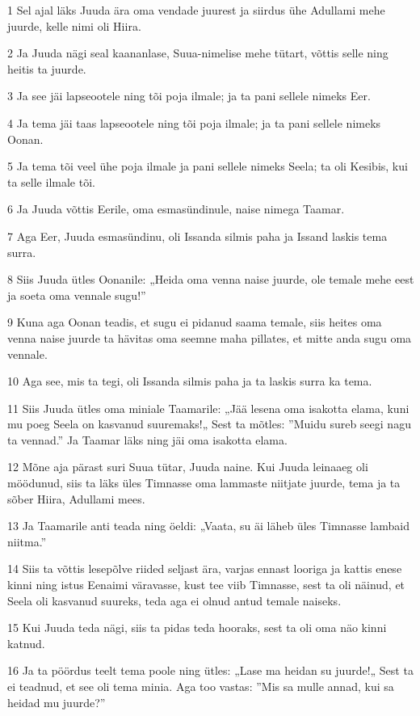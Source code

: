\par 1 Sel ajal läks Juuda ära oma vendade juurest ja siirdus ühe Adullami mehe juurde, kelle nimi oli Hiira.
\par 2 Ja Juuda nägi seal kaananlase, Suua-nimelise mehe tütart, võttis selle ning heitis ta juurde.
\par 3 Ja see jäi lapseootele ning tõi poja ilmale; ja ta pani sellele nimeks Eer.
\par 4 Ja tema jäi taas lapseootele ning tõi poja ilmale; ja ta pani sellele nimeks Oonan.
\par 5 Ja tema tõi veel ühe poja ilmale ja pani sellele nimeks Seela; ta oli Kesibis, kui ta selle ilmale tõi.
\par 6 Ja Juuda võttis Eerile, oma esmasündinule, naise nimega Taamar.
\par 7 Aga Eer, Juuda esmasündinu, oli Issanda silmis paha ja Issand laskis tema surra.
\par 8 Siis Juuda ütles Oonanile: „Heida oma venna naise juurde, ole temale mehe eest ja soeta oma vennale sugu!”
\par 9 Kuna aga Oonan teadis, et sugu ei pidanud saama temale, siis heites oma venna naise juurde ta hävitas oma seemne maha pillates, et mitte anda sugu oma vennale.
\par 10 Aga see, mis ta tegi, oli Issanda silmis paha ja ta laskis surra ka tema.
\par 11 Siis Juuda ütles oma miniale Taamarile: „Jää lesena oma isakotta elama, kuni mu poeg Seela on kasvanud suuremaks!„ Sest ta mõtles: ”Muidu sureb seegi nagu ta vennad.” Ja Taamar läks ning jäi oma isakotta elama.
\par 12 Mõne aja pärast suri Suua tütar, Juuda naine. Kui Juuda leinaaeg oli möödunud, siis ta läks üles Timnasse oma lammaste niitjate juurde, tema ja ta sõber Hiira, Adullami mees.
\par 13 Ja Taamarile anti teada ning öeldi: „Vaata, su äi läheb üles Timnasse lambaid niitma.”
\par 14 Siis ta võttis lesepõlve riided seljast ära, varjas ennast looriga ja kattis enese kinni ning istus Eenaimi väravasse, kust tee viib Timnasse, sest ta oli näinud, et Seela oli kasvanud suureks, teda aga ei olnud antud temale naiseks.
\par 15 Kui Juuda teda nägi, siis ta pidas teda hooraks, sest ta oli oma näo kinni katnud.
\par 16 Ja ta pöördus teelt tema poole ning ütles: „Lase ma heidan su juurde!„ Sest ta ei teadnud, et see oli tema minia. Aga too vastas: ”Mis sa mulle annad, kui sa heidad mu juurde?”
